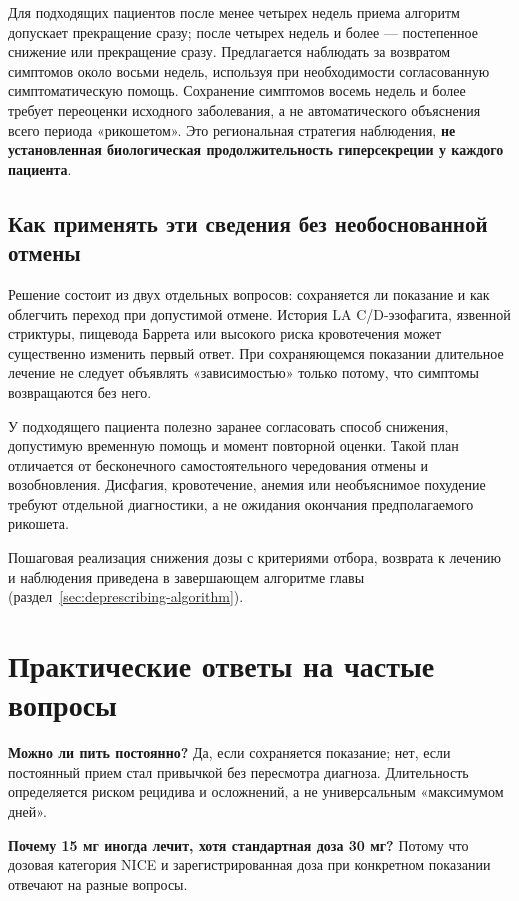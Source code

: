 \documentclass[11pt,a4paper,notitlepage]{report}
\newcommand{\src}[1]{\unskip\space\cite{#1}}
\begin{document}
Для подходящих пациентов после менее четырех недель приема алгоритм допускает прекращение сразу; после четырех недель и более --- постепенное снижение или прекращение сразу. Предлагается наблюдать за возвратом симптомов около восьми недель, используя при необходимости согласованную симптоматическую помощь. Сохранение симптомов восемь недель и более требует переоценки исходного заболевания, а не автоматического объяснения всего периода «рикошетом». Это региональная стратегия наблюдения, \textbf{не установленная биологическая продолжительность гиперсекреции у каждого пациента}.\src{seadepres2026}

\subsection{Как применять эти сведения без необоснованной отмены}
Решение состоит из двух отдельных вопросов: сохраняется ли показание и как облегчить переход при допустимой отмене. История LA C/D-эзофагита, язвенной стриктуры, пищевода Баррета или высокого риска кровотечения может существенно изменить первый ответ. При сохраняющемся показании длительное лечение не следует объявлять «зависимостью» только потому, что симптомы возвращаются без него.\src{agadepres,acggerd,barrett2025}

У подходящего пациента полезно заранее согласовать способ снижения, допустимую временную помощь и момент повторной оценки. Такой план отличается от бесконечного самостоятельного чередования отмены и возобновления. Дисфагия, кровотечение, анемия или необъяснимое похудение требуют отдельной диагностики, а не ожидания окончания предполагаемого рикошета.\src{agadepres,acggerd}

Пошаговая реализация снижения дозы с критериями отбора, возврата к лечению и наблюдения приведена в завершающем алгоритме главы (раздел~\ref{sec:deprescribing-algorithm}).

\section{Практические ответы на частые вопросы}

\textbf{Можно ли пить постоянно?} Да, если сохраняется показание; нет, если постоянный прием стал привычкой без пересмотра диагноза. Длительность определяется риском рецидива и осложнений, а не универсальным «максимумом дней».\src{agadepres}

\textbf{Почему 15 мг иногда лечит, хотя стандартная доза 30 мг?} Потому что дозовая категория NICE и зарегистрированная доза при конкретном показании отвечают на разные вопросы.\src{nice,uslabel}
\end{document}
